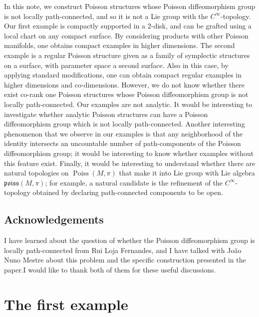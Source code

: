 \documentclass[AHL,Unicode,published]{cedram}
\newcommand{\fkPoiss}{\mathfrak{poiss}}
\DeclareMathOperator{\Poiss}{Poiss}
\begin{document}
In this note, we construct Poisson structures whose Poisson diffeomorphism group is not locally path-connected, and so it is not a Lie group with the $C^{\infty}$-topology. Our first example is compactly supported in a 2-disk, and can be grafted using a local chart on any compact surface. By considering products with other Poisson manifolds, one obtains compact examples in higher dimensions. The second example is a regular Poisson structure given as a family of symplectic structures on a surface, with parameter space a second surface. Also in this case, by applying standard modifications, one can obtain compact regular examples in higher dimensions and co-dimensions. However, we do not know whether there exist co-rank one Poisson structures whose Poisson diffeomorphism group is not locally path-connected. Our examples are not analytic. It would be interesting to investigate whether analytic Poisson structures can have a Poisson diffeomorphism group which is not locally path-connected. Another interesting phenomenon that we observe in our examples is that any neighborhood of the identity intersects an uncountable number of path-components of the Poisson diffeomorphism group; it would be interesting to know whether examples without this feature exist. Finally, it would be interesting to understand whether there are natural topologies on $\Poiss(M,\pi)$ that make it into Lie group with Lie algebra $\fkPoiss(M,\pi)$; for example, a natural candidate is the refinement of the $C^{\infty}$-topology obtained by declaring path-connected components to be open.


\subsection*{Acknowledgements}
I have learned about the question of whether the Poisson diffeomorphism group is locally path-connected from Rui Loja Fernandes, and I have talked with João Nuno Mestre about this problem and the specific construction presented in the paper.\linebreak I would like to thank both of them for these useful discussions.


\section{The first example}
\end{document}
